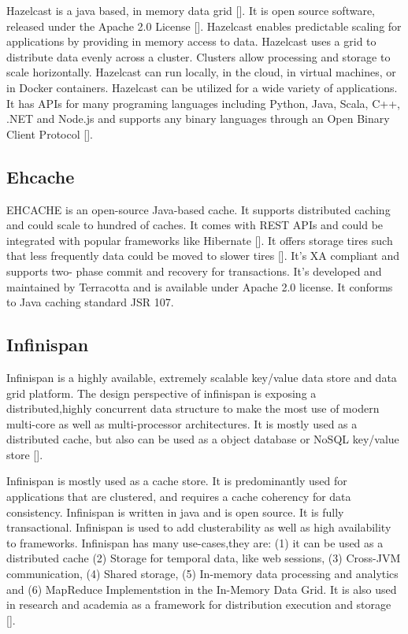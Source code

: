 Hazelcast is a java based, in memory data grid [\cite{www-wikihazel}].
It is open source software, released under the Apache 2.0
License [\cite{www-githubhazel}]. Hazelcast enables predictable scaling
for applications by providing in memory access to data.  Hazelcast
uses a grid to distribute data evenly across a cluster. Clusters allow
processing and storage to scale horizontally. Hazelcast can run
locally, in the cloud, in virtual machines, or in Docker
containers. Hazelcast can be utilized for a wide variety of
applications. It has APIs for many programing languages including
Python, Java, Scala, C++, .NET and Node.js and supports any binary
languages through an Open Binary Client Protocol [\cite{www-wikihazel}].

\subsection{Ehcache}

EHCACHE is an open-source Java-based cache. It supports distributed
caching and could scale to hundred of caches. It comes with REST APIs
and could be integrated with popular frameworks like
Hibernate [\cite{www-ehcache-features}]. It offers storage tires such
that less frequently data could be moved to slower
tires [\cite{www-ehcache-documentation}]. It's XA compliant and supports
two- phase commit and recovery for transactions. It's developed and
maintained by Terracotta and is available under Apache 2.0 license.
It conforms to Java caching standard JSR 107.

\subsection{Infinispan}

Infinispan is a highly available, extremely scalable key/value data
store and data grid platform. The design perspective of infinispan is
exposing a distributed,highly concurrent data structure to make the
most use of modern multi-core as well as multi-processor
architectures. It is mostly used as a distributed cache, but also can
be used as a object database or NoSQL key/value
store [\cite{infinispan.org}].

Infinispan is mostly used as a cache store. It is predominantly used
for applications that are clustered, and requires a cache coherency
for data consistency. Infinispan is written in java and is open
source. It is fully transactional. Infinispan is used to add
clusterability as well as high availability to frameworks.  Infinispan
has many use-cases,they are: (1) it can be used as a distributed cache
(2) Storage for temporal data, like web sessions, (3) Cross-JVM
communication, (4) Shared storage, (5) In-memory data processing and
analytics and (6) MapReduce Implementstion in the In-Memory Data
Grid. It is also used in research and academia as a framework for
distribution execution and storage [\cite{infinispan_wikipedia}].
     
